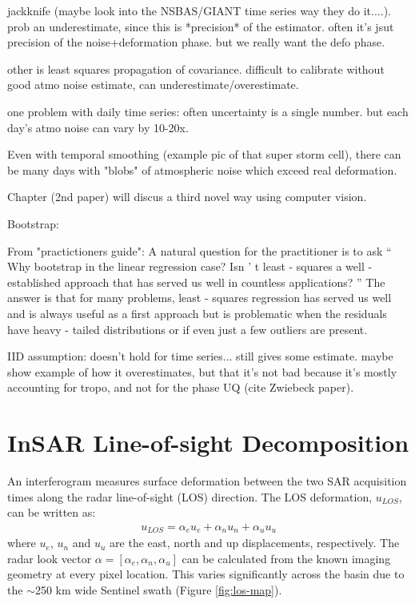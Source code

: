 jackknife (maybe look into the NSBAS/GIANT time series way they do it....). prob an underestimate, since this is *precision* of the estimator. often it's jsut precision of the noise+deformation phase. but we really want the defo phase.

other is least squares propagation of covariance. difficult to calibrate without good atmo noise estimate, can underestimate/overestimate.

one problem with daily time series: often uncertainty is a single number. but each day's atmo noise can vary by 10-20x.

Even with temporal smoothing (example pic of that super storm cell), there can be many days with "blobs" of atmospheric noise which exceed real deformation.

Chapter (2nd paper) will discus a third novel way using computer vision.


Bootstrap:

From "practictioners guide":
A natural question for the practitioner is to ask  “ Why bootstrap in the linear regression case? Isn ’ t least - squares a well - established approach that  has  served  us  well  in  countless  applications? ”   The  answer  is  that  for  many  problems, least - squares regression has served us well and is always useful as  a first approach but is problematic when the residuals have heavy - tailed distributions or if even just a few outliers are present.

IID assumption: doesn't hold for time series... still gives some estimate. maybe show example of how it overestimates, but that it's not bad because it's mostly accounting for tropo, and not for the phase UQ (cite Zwiebeck paper).





\section{InSAR Line-of-sight Decomposition}
\label{sec:ch3-insar-decomp}
An interferogram measures surface deformation between the two SAR acquisition times along the radar line-of-sight (LOS) direction. The LOS deformation, $u_{LOS}$, can be written as: 
\begin{align}
	u_{LOS}= \alpha_{e} u_{e} + \alpha_{n} u_{n} + \alpha_{u} u_{u}
\end{align}
where $u_{e}$, $u_{n}$ and $u_{u}$ are the east, north and up displacements, respectively. The radar look vector $\alpha = [\alpha_e, \alpha_n, \alpha_u]$ can be calculated from the known imaging geometry at every pixel location. This varies significantly across the basin due to the $ \sim$250 km wide Sentinel swath (Figure \ref{fig:los-map}). 



